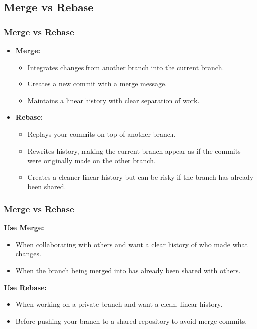 \documentclass{beamer}
\begin{document}
    \subsection{Merge vs Rebase}\label{subsec:merge-rebase}
    \begin{frame}
        \frametitle{Merge vs Rebase}
        \begin{itemize}
            \item \textbf{Merge:}
                \begin{itemize}
                    \item Integrates changes from another branch into the current branch.
                    \item Creates a new commit with a merge message.
                    \item Maintains a linear history with clear separation of work.
                \end{itemize}
            \item \textbf{Rebase:}
                \begin{itemize}
                    \item Replays your commits on top of another branch.
                    \item Rewrites history, making the current branch appear as if the commits were originally made on the other branch.
                    \item Creates a cleaner linear history but can be risky if the branch has already been shared.
                \end{itemize}
        \end{itemize}
    \end{frame}

    \begin{frame}
        \frametitle{Merge vs Rebase}
        \item \textbf{Use Merge:}
        \begin{itemize}
            \item When collaborating with others and want a clear history of who made what changes.
            \item When the branch being merged into has already been shared with others.
        \end{itemize}
    
        \textbf{Use Rebase:}
        \begin{itemize}
            \item When working on a private branch and want a clean, linear history.
            \item Before pushing your branch to a shared repository to avoid merge commits.
        \end{itemize}
    \end{frame}
\end{document}
